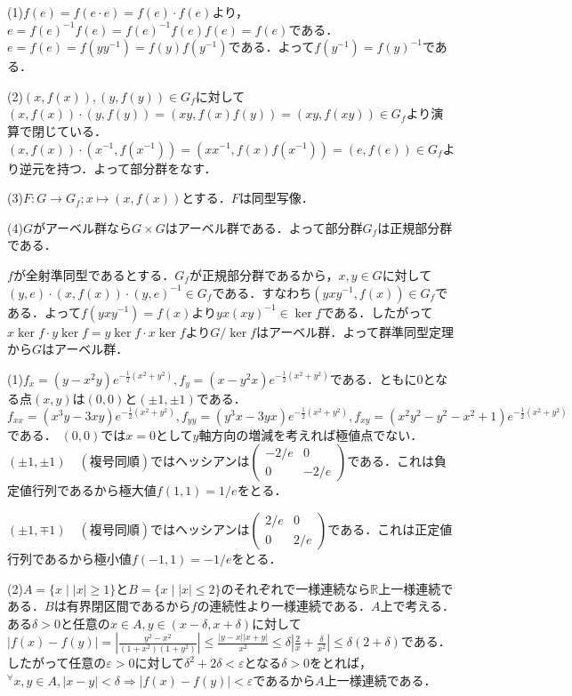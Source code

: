\documentclass[
		book,
		head_space=20mm,
		foot_space=20mm,
		gutter=10mm,
		line_length=190mm
]{jlreq}
\begin{document}
(1)$f(e)=f(e\cdot e)=f(e)\cdot f(e)$より，$e=f(e)^{-1}f(e)=f(e)^{-1}f(e)f(e)=f(e)$である．
$e=f(e)=f(yy^{-1})=f(y)f(y^{-1})$である．よって$f(y^{-1})=f(y)^{-1}$である．

(2)$(x,f(x)),(y,f(y))\in G_f$に対して$(x,f(x))\cdot(y,f(y))=(xy,f(x)f(y))=(xy,f(xy))\in G_f$より演算で閉じている．
$(x,f(x))\cdot(x^{-1},f(x^{-1}))=(xx^{-1},f(x)f(x^{-1}))=(e,f(e))\in G_f$より逆元を持つ．よって部分群をなす．

(3)$F \colon G \rightarrow G_f;x\mapsto (x,f(x))$とする．$F$は同型写像．

(4)$G$がアーベル群なら$G \times G$はアーベル群である．よって部分群$G_f$は正規部分群である．

$f$が全射準同型であるとする．$G_f$が正規部分群であるから，$x,y \in G$に対して$(y,e)\cdot(x,f(x))\cdot(y,e)^{-1}\in G_f$である．すなわち$(yxy^{-1},f(x))\in G_f$である．よって$f(yxy^{-1})=f(x)$より$yx(xy)^{-1}\in \ker f$である．したがって$x\ker f \cdot y\ker f=y\ker f \cdot x\ker f$より$G/\ker f$はアーベル群．よって群準同型定理から$G$はアーベル群．

(1)$f_x=(y-x^2y)e^{-\frac{1}{2}(x^2+y^2)},f_y=(x-y^2x)e^{-\frac{1}{2}(x^2+y^2)}$である．ともに$0$となる点$(x,y)$は$(0,0)$と$(\pm{1},\pm{1})$である．
$f_{xx}=(x^3y-3xy)e^{-\frac{1}{2}(x^2+y^2)},f_{yy}=(y^3x-3yx)e^{-\frac{1}{2}(x^2+y^2)},f_{xy}=(x^2y^2-y^2-x^2+1)e^{-\frac{1}{2}(x^2+y^2)}$である．
$(0,0)$では$x=0$として$y$軸方向の増減を考えれば極値点でない．
$(\pm{1},\pm{1})\quad(\text{複号同順})$ではヘッシアンは$\begin{pmatrix}
	-2/e & 0\\
	0 & -2/e
	\end{pmatrix}$である．これは負定値行列であるから極大値$f(1,1)=1/e$をとる．

$(\pm{1},\mp{1}) \quad(\text{複号同順})$ではヘッシアンは$\begin{pmatrix}
	2/e & 0\\
	0 & 2/e
	\end{pmatrix}$である．これは正定値行列であるから極小値$f(-1,1)=-1/e$をとる．

(2)$A=\{x \mid |x|\ge 1\}$と$B=\{ x \mid |x|\le 2\}$のそれぞれで一様連続なら$\mathbb{R}$上一様連続である．$B$は有界閉区間であるから$f$の連続性より一様連続である．$A$上で考える．ある$\delta>0$と任意の$x\in A ,y \in (x-\delta,x+\delta)$に対して
$|f(x)-f(y)|=\left|\frac{y^2-x^2}{(1+x^2)(1+y^2)}\right|\le \frac{|y-x||x+y|}{x^2}\le \delta|\frac{2}{x}+\frac{\delta}{x^2}|\le\delta(2+\delta)$である．
したがって任意の$\varepsilon>0$に対して$\delta^2+2\delta<\varepsilon$となる$\delta>0$をとれば，${}^\forall x,y \in A , |x-y|<\delta \Rightarrow |f(x)-f(y)|<\varepsilon$であるから$A$上一様連続である．
\end{document}
